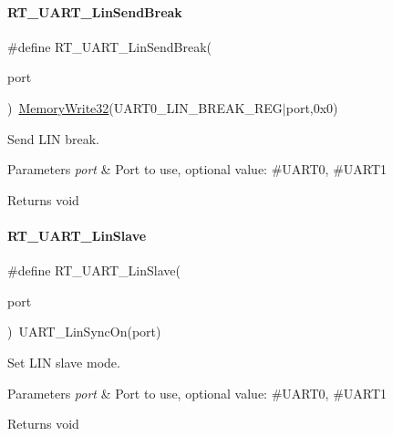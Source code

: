 \paragraph{\texorpdfstring{R\+T\+\_\+\+U\+A\+R\+T\+\_\+\+Lin\+Send\+Break}{RT\_UART\_LinSendBreak}}
{\footnotesize\ttfamily \#define R\+T\+\_\+\+U\+A\+R\+T\+\_\+\+Lin\+Send\+Break(\begin{DoxyParamCaption}\item[{}]{port }\end{DoxyParamCaption})~\mbox{\hyperlink{a00020_ad9953f631a539cfaa35baf94f878b3ec}{Memory\+Write32}}(U\+A\+R\+T0\+\_\+\+L\+I\+N\+\_\+\+B\+R\+E\+A\+K\+\_\+\+R\+EG$\vert$port,0x0)}



Send L\+IN break. 


\begin{DoxyParams}{Parameters}
{\em port} & Port to use, optional value\+: \#\+U\+A\+R\+T0, \#\+U\+A\+R\+T1 \\
\hline
\end{DoxyParams}
\begin{DoxyReturn}{Returns}
void 
\end{DoxyReturn}
\mbox{\label{a00056_a3f9518fa74ec401803fe1d15e0d39ff2}} 
\paragraph{\texorpdfstring{R\+T\+\_\+\+U\+A\+R\+T\+\_\+\+Lin\+Slave}{RT\_UART\_LinSlave}}
{\footnotesize\ttfamily \#define R\+T\+\_\+\+U\+A\+R\+T\+\_\+\+Lin\+Slave(\begin{DoxyParamCaption}\item[{}]{port }\end{DoxyParamCaption})~U\+A\+R\+T\+\_\+\+Lin\+Sync\+On(port)}



Set L\+IN slave mode. 


\begin{DoxyParams}{Parameters}
{\em port} & Port to use, optional value\+: \#\+U\+A\+R\+T0, \#\+U\+A\+R\+T1 \\
\hline
\end{DoxyParams}
\begin{DoxyReturn}{Returns}
void 
\end{DoxyReturn}
\mbox{\label{a00056_aea01869278bc3c4e332af854c4e660be}} 
